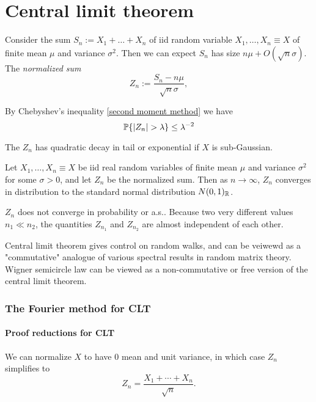 \part{Central limit theorem}

Consider the sum $S_n := X_1+\dots+X_n$ of iid random variable $X_1,\dots,X_n \equiv X$ of finite mean $\mu$ and variance $\sigma^2$. Then we can expect $S_n$ has size $n\mu+O(\sqrt{n}\sigma)$. The \textit{normalized sum}
\begin{equation}
    Z_n := \frac{S_n - n\mu}{\sqrt{n}\sigma},
\end{equation}

By Chebyshev's inequality \ref{second moment method} we have 
\begin{equation}
    \Pb\{|Z_n|>\lambda\} \leq \lambda^{-2}
\end{equation}

The $Z_n$ has quadratic decay in tail or exponential if $X$ is sub-Gaussian.

\begin{theorem}
    \label{central limit theorem}
    Let $X_1,\dots,X_n \equiv X$ be iid real random variables of finite mean $\mu$ and variance $\sigma^2$ for some $\sigma>0$, and let $Z_n$ be the normalized sum. Then as $n\to \infty$, $Z_n$ converges in distribution to the standard normal distribution $N(0,1)_{\mathbb{R}}$.
\end{theorem}

$Z_n$ does not converge in probability or a.s.. Because two very different values $n_1 \ll n_2$, the quantities $Z_{n_1}$ and $Z_{n_2}$ are almost independent of each other.

Central limit theorem gives control on random walks, and can be veiwewd as a "commutative" analogue of various spectral results in random matrix theory. Wigner semicircle law can be viewed as a non-commutative or free version of the central limit theorem.

\section{The Fourier method for CLT}

\subsection{Proof reductions for CLT}

We can normalize $X$ to have 0 mean and unit variance, in which case $Z_n$ simplifies to 
\begin{equation}
    Z_n = \frac{X_1+\cdots+X_n}{\sqrt{n}}.
\end{equation}


